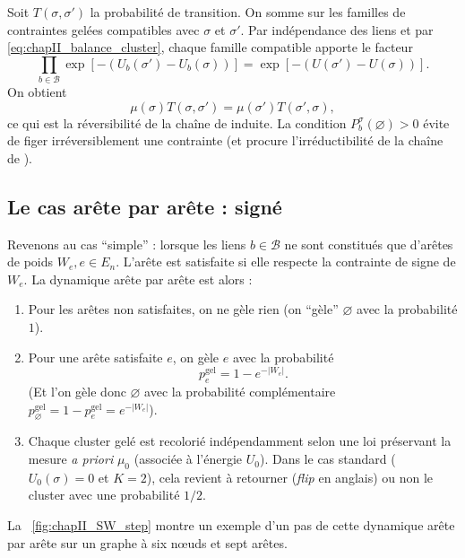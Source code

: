 \begin{Preuve}
Soit $T(\sigma,\sigma')$ la probabilité de transition. On somme sur les familles de contraintes gelées compatibles avec $\sigma$ et $\sigma'$. Par indépendance des liens et par \eqref{eq:chapII_balance_cluster}, chaque famille compatible apporte le facteur
\[
    \prod_{b\in\mathcal B}\exp[-(U_b(\sigma')-U_b(\sigma))]
    =
    \exp[-(U(\sigma')-U(\sigma))].
\]
On obtient
\[
    {\mu(\sigma)}T(\sigma,\sigma')={\mu(\sigma')}T(\sigma',\sigma),
\]
ce qui est la réversibilité de la chaîne de  induite. La condition $P_b^\sigma(\varnothing)>0$ évite de figer irréversiblement une contrainte (et procure l'irréductibilité de la chaîne de ).
\end{Preuve}

\subsection{Le cas arête par arête :  signé}

Revenons au cas ``simple'' : lorsque les liens $b \in \mathcal B$ ne sont constitués que d'arêtes de poids $W_e, e \in E_n$.
L'arête est satisfaite si elle respecte la contrainte de signe de $W_e$. La dynamique arête par arête est alors :
\begin{enumerate}
    \item Pour les arêtes non satisfaites, on ne gèle rien (on ``gèle'' $\varnothing$ avec la probabilité $1$).
    \item Pour une arête satisfaite $e$, on gèle $e$ avec la probabilité
    \begin{equation}
        p_e^{\mathrm{gel}}=1-e^{-|W_e|}.
        \label{eq:chapII_freeze_edge_weight}
    \end{equation}
    (Et l'on gèle donc $\varnothing$ avec la probabilité complémentaire $p_{\varnothing}^{\mathrm{gel}} = 1-p_e^{\mathrm{gel}} =  e^{-|W_e|}$).
    \item Chaque cluster gelé est recolorié indépendamment selon une loi préservant la mesure \emph{a priori} $\mu_0$ (associée à l'énergie $U_0$). Dans le cas standard ($U_0(\sigma) = 0$ et $K=2$), cela revient à retourner (\emph{flip} en anglais) ou non le cluster avec une probabilité $1/2$.
\end{enumerate}

La \Fig~\ref{fig:chapII_SW_step} montre un exemple d'un pas de cette dynamique arête par arête sur un graphe à six nœuds et sept arêtes.


